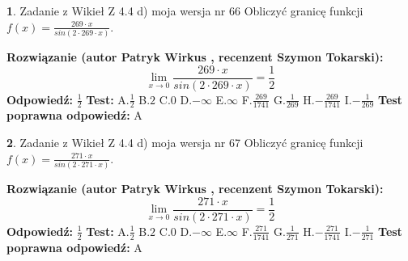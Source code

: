 \documentclass[12pt, a4paper]{article}
\theoremstyle{definition} %
\newtheorem{zad}{}
\newcommand{\zadStart}[1]{\begin{zad}#1\newline}
\newcommand{\zadStop}{\end{zad}}
\newcommand{\rozwStart}[2]{\noindent \textbf{Rozwiązanie (autor #1 , recenzent #2): }\newline}
\newcommand{\rozwStop}{\newline}
\newcommand{\odpStart}{\noindent \textbf{Odpowiedź:}\newline}
\newcommand{\odpStop}{\newline}
\newcommand{\testStart}{\noindent \textbf{Test:}\newline}
\newcommand{\testStop}{\newline}
\newcommand{\kluczStart}{\noindent \textbf{Test poprawna odpowiedź:}\newline}
\newcommand{\kluczStop}{\newline}
\begin{document}
\zadStart{Zadanie z Wikieł Z 4.4 d) moja wersja nr 66}
Obliczyć granicę funkcji $f(x)=\frac{269\cdot x}{sin(2 \cdot269\cdot x)}$.
\zadStop
\rozwStart{Patryk Wirkus}{Szymon Tokarski}
$$\lim\limits_{x\to 0}\frac{269\cdot x}{sin(2 \cdot269\cdot x)}=\frac{1}{2}$$
\rozwStop
\odpStart
$\frac{1}{2}$
\odpStop
\testStart
A.$\frac{1}{2}$
B.$2$
C.$0$
D.$-\infty$
E.$\infty$
F.$\frac{269}{1741}$
G.$\frac{1}{269}$
H.$-\frac{269}{1741}$
I.$-\frac{1}{269}$
\testStop
\kluczStart
A
\kluczStop



\zadStart{Zadanie z Wikieł Z 4.4 d) moja wersja nr 67}
Obliczyć granicę funkcji $f(x)=\frac{271\cdot x}{sin(2 \cdot271\cdot x)}$.
\zadStop
\rozwStart{Patryk Wirkus}{Szymon Tokarski}
$$\lim\limits_{x\to 0}\frac{271\cdot x}{sin(2 \cdot271\cdot x)}=\frac{1}{2}$$
\rozwStop
\odpStart
$\frac{1}{2}$
\odpStop
\testStart
A.$\frac{1}{2}$
B.$2$
C.$0$
D.$-\infty$
E.$\infty$
F.$\frac{271}{1741}$
G.$\frac{1}{271}$
H.$-\frac{271}{1741}$
I.$-\frac{1}{271}$
\testStop
\kluczStart
A
\kluczStop
\end{document}
